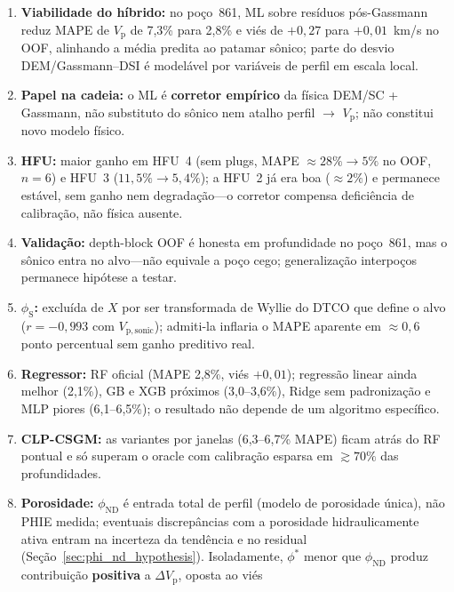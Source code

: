 \documentclass[11pt,a4paper]{article}
\numberwithin{equation}{section}
\newcommand{\Vp}{\ensuremath{V_{\mathrm{p}}}}
\newcommand{\phiND}{\ensuremath{\phi_{\mathrm{ND}}}}
\newcommand{\phiS}{\ensuremath{\phi_{\mathrm{S}}}}
\begin{document}
\begin{enumerate}
  \item \textbf{Viabilidade do híbrido:} no poço~861, ML sobre resíduos
        pós-Gassmann reduz MAPE de \Vp{} de 7,3\% para 2,8\% e viés de
        $+0{,}27$ para $+0{,}01$~km/s no OOF, alinhando a média predita ao
        patamar sônico; parte do desvio DEM/Gassmann--DSI é modelável por
        variáveis de perfil em escala local.
  \item \textbf{Papel na cadeia:} o ML é \textbf{corretor empírico} da física
        DEM/SC + Gassmann, não substituto do sônico nem atalho perfil
        $\rightarrow$ \Vp{}; não constitui novo modelo físico.
  \item \textbf{HFU:} maior ganho em HFU~4 (sem plugs,
        MAPE $\approx 28\% \rightarrow 5\%$ no OOF, $n=6$) e HFU~3
        ($11{,}5\% \rightarrow 5{,}4\%$); a HFU~2 já era boa
        ($\approx 2\%$) e permanece estável, sem ganho nem degradação---o
        corretor compensa deficiência de calibração, não física ausente.
  \item \textbf{Validação:} depth-block OOF é honesta em profundidade no
        poço~861, mas o sônico entra no alvo---não equivale a poço cego;
        generalização interpoços permanece hipótese a testar.
  \item \textbf{\phiS{}:} excluída de $X$ por ser transformada de Wyllie do
        DTCO que define o alvo ($r = -0{,}993$ com $V_{\mathrm{p,sonic}}$);
        admiti-la inflaria o MAPE aparente em $\approx 0{,}6$ ponto percentual
        sem ganho preditivo real.
  \item \textbf{Regressor:} RF oficial (MAPE 2,8\%, viés $+0{,}01$); regressão
        linear ainda melhor (2,1\%), GB e XGB próximos (3,0--3,6\%), Ridge sem
        padronização e MLP piores (6,1--6,5\%); o resultado não depende de um
        algoritmo específico.
  \item \textbf{CLP-CSGM:} as variantes por janelas (6,3--6,7\% MAPE) ficam
        atrás do RF pontual e só superam o oracle com calibração esparsa em
        $\gtrsim 70\%$ das profundidades.
  \item \textbf{Porosidade:} \phiND{} é entrada total de perfil (modelo de
        porosidade única), não PHIE medida; eventuais discrepâncias com a
        porosidade hidraulicamente ativa entram na incerteza da tendência e
        no residual (Seção~\ref{sec:phi_nd_hypothesis}).
        Isoladamente, $\phi^{*}$ menor que \phiND{} produz contribuição
        \textbf{positiva} a $\Delta V_{\mathrm{p}}$, oposta ao viés

\end{enumerate}
\end{document}
